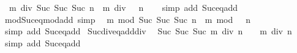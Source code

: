 \begin{isabellebody}
\ \ {\isachardoublequoteopen}m\ div\ Suc\ {\isacharparenleft}{\kern0pt}Suc\ {\isacharparenleft}{\kern0pt}Suc\ n{\isacharparenright}{\kern0pt}{\isacharparenright}{\kern0pt}\ {\isacharequal}{\kern0pt}\ m\ div\ {\isacharparenleft}{\kern0pt}{}\ {\isacharplus}{\kern0pt}\ n{\isacharparenright}{\kern0pt}{\isachardoublequoteclose}\isanewline
%
\isadelimproof
\ \ %
\endisadelimproof
%
\isatagproof
{}\isamarkupfalse%
\ {\isacharparenleft}{\kern0pt}simp\ add{\isacharcolon}{\kern0pt}\ Suc{}{\isacharunderscore}{\kern0pt}eq{\isacharunderscore}{\kern0pt}add{\isacharunderscore}{\kern0pt}{}{\isacharparenright}{\kern0pt}%
\endisatagproof
{\isafoldproof}%
%
\isadelimproof
\isanewline
%
\endisadelimproof
\isanewline
{}\isamarkupfalse%
\ mod{\isacharunderscore}{\kern0pt}Suc{\isacharunderscore}{\kern0pt}eq{\isacharunderscore}{\kern0pt}mod{\isacharunderscore}{\kern0pt}add{}\ {\isacharbrackleft}{\kern0pt}simp{\isacharbrackright}{\kern0pt}{\isacharcolon}{\kern0pt}\isanewline
\ \ {\isachardoublequoteopen}m\ mod\ Suc\ {\isacharparenleft}{\kern0pt}Suc\ {\isacharparenleft}{\kern0pt}Suc\ n{\isacharparenright}{\kern0pt}{\isacharparenright}{\kern0pt}\ {\isacharequal}{\kern0pt}\ m\ mod\ {\isacharparenleft}{\kern0pt}{}\ {\isacharplus}{\kern0pt}\ n{\isacharparenright}{\kern0pt}{\isachardoublequoteclose}\isanewline
%
\isadelimproof
\ \ %
\endisadelimproof
%
\isatagproof
{}\isamarkupfalse%
\ {\isacharparenleft}{\kern0pt}simp\ add{\isacharcolon}{\kern0pt}\ Suc{}{\isacharunderscore}{\kern0pt}eq{\isacharunderscore}{\kern0pt}add{\isacharunderscore}{\kern0pt}{}{\isacharparenright}{\kern0pt}%
\endisatagproof
{\isafoldproof}%
%
\isadelimproof
\isanewline
%
\endisadelimproof
\isanewline
{}\isamarkupfalse%
\ Suc{\isacharunderscore}{\kern0pt}div{\isacharunderscore}{\kern0pt}eq{\isacharunderscore}{\kern0pt}add{}{\isacharunderscore}{\kern0pt}div{\isacharcolon}{\kern0pt}\isanewline
\ \ {\isachardoublequoteopen}Suc\ {\isacharparenleft}{\kern0pt}Suc\ {\isacharparenleft}{\kern0pt}Suc\ m{\isacharparenright}{\kern0pt}{\isacharparenright}{\kern0pt}\ div\ n\ {\isacharequal}{\kern0pt}\ {\isacharparenleft}{\kern0pt}{}\ {\isacharplus}{\kern0pt}\ m{\isacharparenright}{\kern0pt}\ div\ n{\isachardoublequoteclose}\isanewline
%
\isadelimproof
\ \ %
\endisadelimproof
%
\isatagproof
{}\isamarkupfalse%
\ {\isacharparenleft}{\kern0pt}simp\ add{\isacharcolon}{\kern0pt}\ Suc{}{\isacharunderscore}{\kern0pt}eq{\isacharunderscore}{\kern0pt}add{\isacharunderscore}{\kern0pt}{}{\isacharparenright}{\kern0pt}%

\end{isabellebody}
